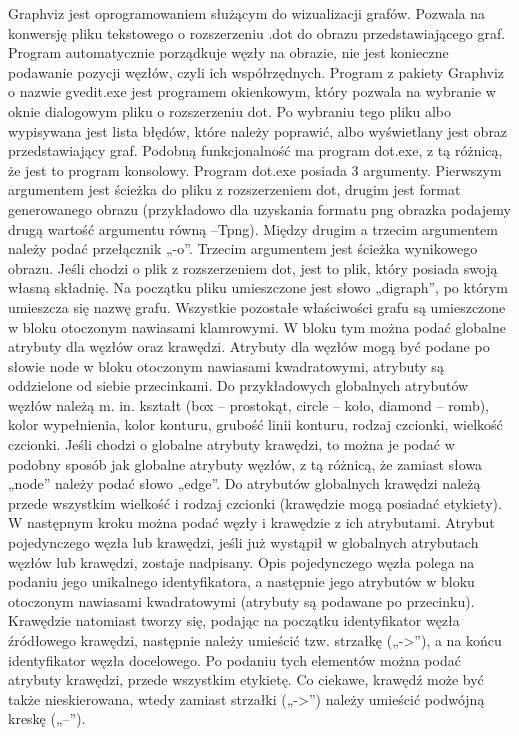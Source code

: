 Graphviz\cite{Graphviz} jest oprogramowaniem służącym do wizualizacji grafów. Pozwala na konwersję pliku tekstowego o rozszerzeniu .dot do obrazu przedstawiającego graf. 
Program automatycznie porządkuje węzły na obrazie, nie jest konieczne podawanie pozycji węzłów, czyli ich współrzędnych. Program z pakiety Graphviz o nazwie gvedit.exe jest programem okienkowym, który pozwala na wybranie w oknie dialogowym pliku o rozszerzeniu dot. Po wybraniu tego pliku albo wypisywana jest lista błędów, które należy poprawić, albo wyświetlany jest obraz przedstawiający graf. Podobną funkcjonalność ma program dot.exe, z tą różnicą, że jest to program konsolowy. Program dot.exe posiada 3 argumenty. Pierwszym argumentem jest ścieżka do pliku z rozszerzeniem dot, drugim jest format generowanego obrazu (przykładowo dla uzyskania formatu png obrazka podajemy drugą wartość argumentu równą –Tpng). Między drugim a trzecim argumentem należy podać przełącznik „-o”. Trzecim argumentem jest ścieżka wynikowego obrazu. Jeśli chodzi o plik z rozszerzeniem dot, jest to plik, który posiada swoją własną składnię. Na początku pliku umieszczone jest słowo „digraph”, po którym umieszcza się nazwę grafu. Wszystkie pozostałe właściwości grafu są umieszczone w bloku otoczonym nawiasami klamrowymi. W bloku tym można podać globalne atrybuty dla węzłów oraz krawędzi. Atrybuty dla węzłów mogą być podane po słowie node w bloku otoczonym nawiasami kwadratowymi, atrybuty są oddzielone od siebie przecinkami. Do przykładowych globalnych atrybutów węzłów należą m. in. kształt (box – prostokąt, circle – koło, diamond – romb), kolor wypełnienia, kolor konturu, grubość linii konturu, rodzaj czcionki, wielkość czcionki. Jeśli chodzi o globalne atrybuty krawędzi, to można je podać w podobny sposób jak globalne atrybuty węzłów, z tą różnicą, że zamiast słowa „node” należy podać słowo „edge”. Do atrybutów globalnych krawędzi należą przede wszystkim wielkość i rodzaj czcionki (krawędzie mogą posiadać etykiety). W następnym kroku można podać węzły i krawędzie z ich atrybutami. Atrybut pojedynczego węzła lub krawędzi, jeśli już wystąpił w globalnych atrybutach węzłów lub krawędzi, zostaje nadpisany. Opis pojedynczego węzła polega na podaniu jego unikalnego identyfikatora, a następnie jego atrybutów w bloku otoczonym nawiasami kwadratowymi (atrybuty są podawane po przecinku).  Krawędzie natomiast tworzy się, podając na początku identyfikator węzła źródłowego krawędzi, następnie należy umieścić tzw. strzałkę („->”), a na końcu identyfikator węzła docelowego. Po podaniu tych elementów można podać atrybuty krawędzi, przede wszystkim etykietę. Co ciekawe, krawędź może być także nieskierowana, wtedy zamiast strzałki („->”) należy umieścić podwójną kreskę („--”). 
